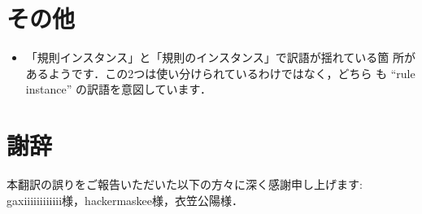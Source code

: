 \documentclass[12pt,titlepage,twoside,openright,dvipdfmx]{jsbook}
\theoremstyle{definition}
\begin{document}
\section*{その他}

\ifnum{}
\begin{itemize}
\item 「規則インスタンス」と「規則のインスタンス」で訳語が揺れている箇
  所があるようです．この2つは使い分けられているわけではなく，どちら
  も ``rule instance'' の訳語を意図しています．
\end{itemize}
\fi

\section*{謝辞}

本翻訳の誤りをご報告いただいた以下の方々に深く感謝申し上げます: gaxiiiiiiiiiiii様，hackermaskee様，衣笠公陽様．
\end{document}
